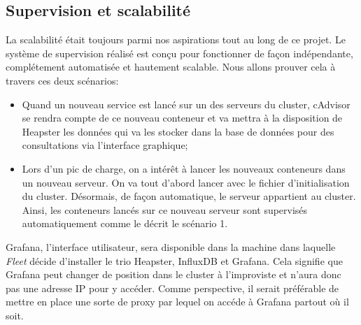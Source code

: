 \begin{onehalfspace}
\subsection{Supervision et scalabilité}

La scalabilité était toujours parmi nos aspirations tout au long de ce projet. Le système de supervision réalisé est conçu pour fonctionner de façon indépendante, complétement automatisée et hautement scalable. Nous allons prouver cela à travers ces deux scénarios:

\begin{itemize}
	\item Quand un nouveau service est lancé sur un des serveurs du cluster, cAdvisor se rendra compte de ce nouveau conteneur et va mettra à la disposition de Heapster les données qui va les stocker dans la base de données pour des consultations via l'interface graphique;
	\item Lors d'un pic de charge, on a intérêt à lancer les nouveaux conteneurs dans un nouveau serveur. On va tout d'abord lancer avec le fichier d'initialisation du cluster. Désormais, de façon automatique, le serveur appartient au cluster. Ainsi, les conteneurs lancés sur ce nouveau serveur sont supervisés automatiquement comme le décrit le scénario 1.
\end{itemize}

Grafana, l'interface utilisateur, sera disponible dans la machine dans laquelle \emph{Fleet} décide d'installer le trio Heapster, InfluxDB et Grafana. Cela signifie que Grafana peut changer de position dans le cluster à l'improviste et n'aura donc pas une adresse IP pour y accéder. Comme perspective, il serait préférable de mettre en place une sorte de proxy par lequel on accéde à Grafana partout où il soit.



\end{onehalfspace}
